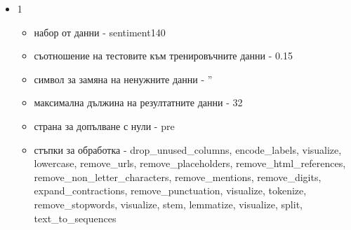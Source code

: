 \documentclass{article}
\begin{document}
\begin{itemize}
\item 1

\begin{itemize}
\item набор от данни - sentiment140
\item съотношение на тестовите към тренировъчните данни - 0.15
\item символ за замяна на ненужните данни - ''
\item максимална дължина на резултатните данни - 32
\item страна за допълване с нули - pre
\item стъпки за обработка - drop\_unused\_columns, encode\_labels, visualize, lowercase, remove\_urls,
remove\_placeholders, remove\_html\_references, remove\_non\_letter\_characters, remove\_mentions,
remove\_digits, expand\_contractions, remove\_punctuation, visualize, tokenize, remove\_stopwords, visualize,
stem, lemmatize, visualize, split, text\_to\_sequences
\end{itemize}


\end{itemize}
\end{document}
